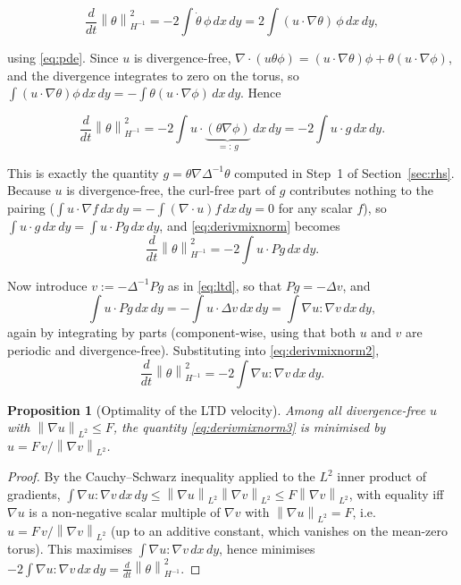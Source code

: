 \documentclass[12pt,a4paper]{article}
\newcommand{\norm}[1]{\left\lVert#1\right\rVert}
\newcommand{\Lap}{\Delta}
\newcommand{\lapinv}{\Delta^{-1}}
\newcommand{\Proj}{P}
\newcommand{\dx}{\,dx\,dy}
\theoremstyle{definition}
\theoremstyle{plain}
\newtheorem{proposition}{Proposition}
\begin{document}
\begin{equation}
  \frac{d}{dt}\norm{\theta}_{H^{-1}}^2
  = -2\int \dot\theta\,\phi \dx
  = 2\int (u\cdot\nabla\theta)\,\phi\dx,
\end{equation}

using \eqref{eq:pde}. Since $u$ is divergence-free, $\nabla\cdot(u\theta\phi)
= (u\cdot\nabla\theta)\phi + \theta(u\cdot\nabla\phi)$, and the divergence
integrates to zero on the torus, so $\int(u\cdot\nabla\theta)\phi\dx =
-\int\theta(u\cdot\nabla\phi)\dx$. Hence

\begin{equation}
  \label{eq:derivmixnorm}
  \frac{d}{dt}\norm{\theta}_{H^{-1}}^2
  = -2\int u\cdot\underbrace{(\theta\nabla\phi)}_{=:\,g}\dx
  = -2\int u\cdot g \dx.
\end{equation}

This is exactly the quantity $g=\theta\nabla\lapinv\theta$ computed in
Step~1 of Section~\ref{sec:rhs}. Because $u$ is divergence-free, the
curl-free part of $g$ contributes nothing to the pairing ($\int
u\cdot\nabla f \dx = -\int(\nabla\cdot u)f\dx = 0$ for any scalar $f$), so
$\int u\cdot g\dx = \int u\cdot\Proj g\dx$, and \eqref{eq:derivmixnorm}
becomes
\begin{equation}
  \label{eq:derivmixnorm2}
  \frac{d}{dt}\norm{\theta}_{H^{-1}}^2 = -2\int u\cdot\Proj g\dx.
\end{equation}

Now introduce $v := -\lapinv\Proj g$ as in \eqref{eq:ltd}, so that
$\Proj g = -\Lap v$, and
\begin{equation}
  \int u\cdot\Proj g\dx = -\int u\cdot\Lap v\dx
  = \int \nabla u : \nabla v \dx,
\end{equation}
again by integrating by parts (component-wise, using that both $u$ and $v$
are periodic and divergence-free). Substituting into
\eqref{eq:derivmixnorm2},
\begin{equation}
  \label{eq:derivmixnorm3}
  \frac{d}{dt}\norm{\theta}_{H^{-1}}^2 = -2\int \nabla u : \nabla v \dx.
\end{equation}

\begin{proposition}[Optimality of the LTD velocity]
\label{prop:ltd}
Among all divergence-free $u$ with $\norm{\nabla u}_{L^2}\le F$, the
quantity \eqref{eq:derivmixnorm3} is minimised by
$u = F\,v/\norm{\nabla v}_{L^2}$.
\end{proposition}
\begin{proof}
By the Cauchy--Schwarz inequality applied to the $L^2$ inner product of
gradients, $\int\nabla u:\nabla v\dx \le \norm{\nabla u}_{L^2}
\norm{\nabla v}_{L^2} \le F\norm{\nabla v}_{L^2}$, with equality iff $\nabla
u$ is a non-negative scalar multiple of $\nabla v$ with
$\norm{\nabla u}_{L^2}=F$, i.e.\ $u = F\,v/\norm{\nabla v}_{L^2}$ (up to an
additive constant, which vanishes on the mean-zero torus). This maximises
$\int\nabla u:\nabla v\dx$, hence minimises
$-2\int\nabla u:\nabla v\dx = \frac{d}{dt}\norm{\theta}_{H^{-1}}^2$.
\end{proof}
\end{document}
